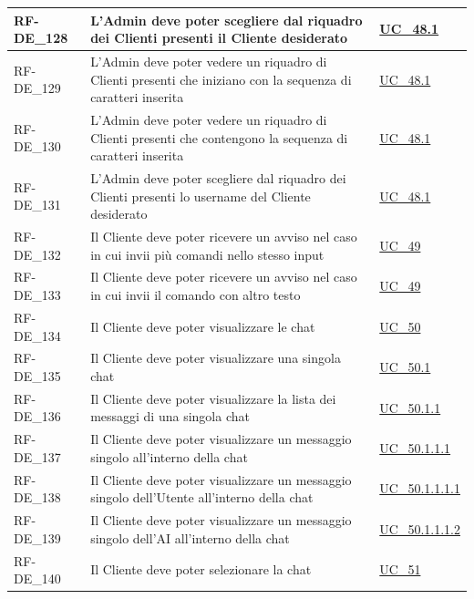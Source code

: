 \begin{longtable}{|>{\raggedright}p{}|>{\raggedright\arraybackslash}p{}|>{\raggedright\arraybackslash}p{}|}
	\hline
	RF-DE\_128 \hypertarget{rf-de_128} & L'Admin deve poter scegliere dal riquadro dei Clienti presenti il Cliente desiderato & \hyperref[uc_48.1]{UC\_48.1} \\
	\hline
	RF-DE\_129 \hypertarget{rf-de_129} & L'Admin deve poter vedere un riquadro di Clienti presenti che iniziano con la sequenza di caratteri inserita & \hyperref[uc_48.1]{UC\_48.1} \\
	\hline
	RF-DE\_130 \hypertarget{rf-de_130} & L'Admin deve poter vedere un riquadro di Clienti presenti che contengono la sequenza di caratteri inserita & \hyperref[uc_48.1]{UC\_48.1} \\
	\hline
	RF-DE\_131 \hypertarget{rf-de_131} & L'Admin deve poter scegliere dal riquadro dei Clienti presenti lo username del Cliente desiderato & \hyperref[uc_48.1]{UC\_48.1} \\
	\hline
	RF-DE\_132 \hypertarget{rf-de_132} & Il Cliente deve poter ricevere un avviso nel caso in cui invii più comandi nello stesso input & \hyperref[uc_49]{UC\_49} \\
	\hline
	RF-DE\_133 \hypertarget{rf-de_133} & Il Cliente deve poter ricevere un avviso nel caso in cui invii il comando con altro testo & \hyperref[uc_49]{UC\_49} \\
	\hline
	RF-DE\_134 \hypertarget{rf-de_134} & Il Cliente deve poter visualizzare le chat & \hyperref[uc_50]{UC\_50} \\
	\hline
	RF-DE\_135 \hypertarget{rf-de_135} & Il Cliente deve poter visualizzare una singola chat & \hyperref[uc_50.1]{UC\_50.1} \\
	\hline
	RF-DE\_136 \hypertarget{rf-de_136} & Il Cliente deve poter visualizzare la lista dei messaggi di una singola chat & \hyperref[uc_50.1.1]{UC\_50.1.1} \\
	\hline
	RF-DE\_137 \hypertarget{rf-de_137} & Il Cliente deve poter visualizzare un messaggio singolo all'interno della chat & \hyperref[uc_50.1.1.1]{UC\_50.1.1.1} \\
	\hline
	RF-DE\_138 \hypertarget{rf-de_137} & Il Cliente deve poter visualizzare un messaggio singolo dell'Utente all'interno della chat & \hyperref[uc_50.1.1.1.1]{UC\_50.1.1.1.1} \\
	\hline
	RF-DE\_139 \hypertarget{rf-de_137} & Il Cliente deve poter visualizzare un messaggio singolo dell'AI all'interno della chat & \hyperref[uc_50.1.1.1.2]{UC\_50.1.1.1.2} \\
	\hline
	RF-DE\_140 \hypertarget{rf-de_138} & Il Cliente deve poter selezionare la chat & \hyperref[uc_51]{UC\_51} \\

\end{longtable}

